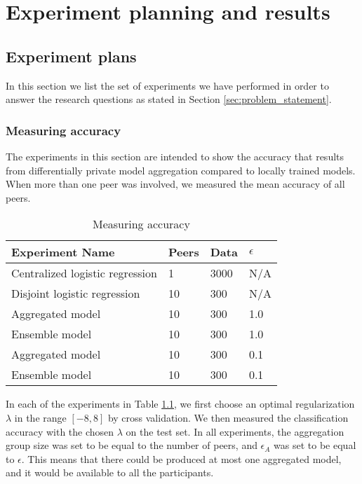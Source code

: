 
\chapter{Experiment planning and results}
\label{ch:experiments_and_results}

\section{Experiment plans}
\label{sec:experiment_plan}

In this section we list the set of experiments we have performed in order to answer the research questions as stated in Section \ref{sec:problem_statement}. 


\subsection{Measuring accuracy}
\label{sec:experiment_measuring_accuracy}
The experiments in this section are intended to show the accuracy that results from differentially private model aggregation compared to locally trained models. When more than one peer was involved, we measured the mean accuracy of all peers.

\begin{table}[h]
	\centering
	\label{tab:experiment_accuracy_measuring}
	\begin{tabular}{|l|l|l|l|}
		{\bf Experiment Name}           & {\bf Peers} & {\bf Data} & {\bf $\epsilon$} \\
		\hline
		Centralized logistic regression & 1           & 3000       & N/A              \\
		Disjoint logistic regression    & 10          & 300        & N/A              \\
		Aggregated model                & 10          & 300        & 1.0              \\
		Ensemble model                  & 10          & 300        & 1.0              \\
		Aggregated model                & 10          & 300        & 0.1              \\
		Ensemble model  & 10    & 300        & 0.1             
	\end{tabular}
	\caption{Measuring accuracy}
\end{table}

In each of the experiments in Table \ref{tab:experiment_accuracy_measuring}, we first choose an optimal regularization $\lambda$ in the range $[-8, 8]$ by cross validation. We then measured the classification accuracy with the chosen $\lambda$ on the test set. In all experiments, the aggregation group size was set to be equal to the number of peers, and $\epsilon_{A}$ was set to be equal to $\epsilon$. This means that there could be produced at most one aggregated model, and it would be available to all the participants.

